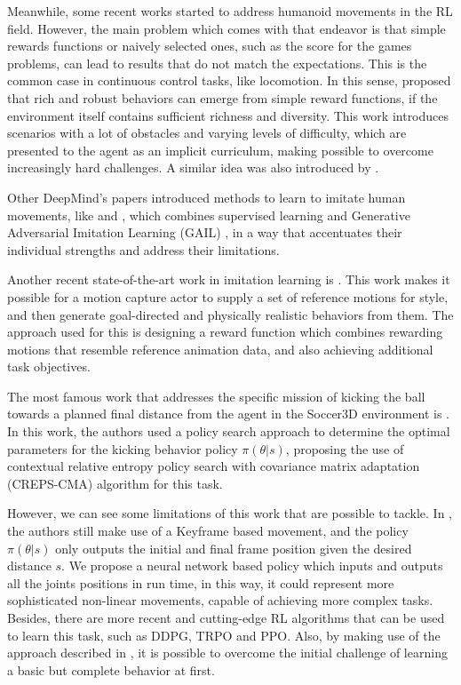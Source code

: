 Meanwhile, some recent works started to address humanoid movements in the RL field. However, the main problem which comes with that endeavor is that simple rewards functions or naively selected ones, such as the score for the games problems, can lead to results that do not match the expectations. This is the common case in continuous control tasks, like locomotion. In this sense,  proposed that rich and robust behaviors can emerge from simple reward functions, if the environment itself contains sufficient richness and diversity. This work introduces scenarios with a lot of obstacles and varying levels of difficulty, which are presented to the agent as an implicit curriculum, making possible to overcome increasingly hard challenges. A similar idea was also introduced by \cite{BengioCurrLearning}.

Other DeepMind's papers introduced methods to learn to imitate human movements, like \cite{deepmind2} and \cite{deepmind3}, which combines supervised learning and Generative Adversarial Imitation Learning (GAIL) \cite{gail}, in a way that accentuates their individual strengths and address their limitations.

Another recent state-of-the-art work in imitation learning is \cite{deepmimic}. This work makes it possible for a motion capture actor to supply a set of reference motions for style, and then generate goal-directed and physically realistic behaviors from them. The approach used for this is designing a reward function which combines rewarding motions that resemble reference animation data, and also achieving additional task objectives.

The most famous work that addresses the specific mission of kicking the ball towards a planned final distance from the agent in the Soccer3D environment is \cite{abbas}. In this work, the authors used a policy search approach to determine the optimal parameters for the kicking behavior policy $\pi(\theta | s)$, proposing the use of contextual relative entropy policy search with covariance matrix adaptation (CREPS-CMA) algorithm for this task.

However, we can see some limitations of this work that are possible to tackle. In \cite{abbas}, the authors still make use of a Keyframe based movement, and the policy $\pi(\theta | s)$ only outputs the initial and final frame position given the desired distance $s$. We propose a neural network based policy which inputs and outputs all the joints positions in run time, in this way, it could represent more sophisticated non-linear movements, capable of achieving more complex tasks. Besides, there are more recent and cutting-edge RL algorithms that can be used to learn this task, such as DDPG, TRPO and PPO. Also, by making use of the approach described in \cite{deepmimic}, it is possible to overcome the initial challenge of learning a basic but complete behavior at first.

